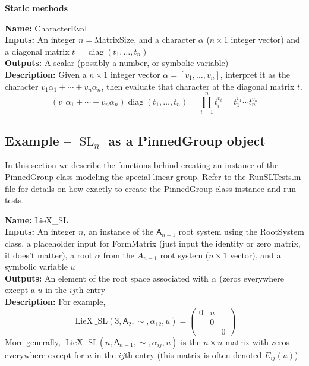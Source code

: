 \documentclass[12pt]{article}
\theoremstyle{definition}
\numberwithin{theorem}{subsection}
\newcommand{\tbf}{\textbf}
\newcommand{\noi}{\noindent}
\DeclareMathOperator{\SL}{SL}
\DeclareMathOperator{\diag}{diag}
\DeclareMathOperator{\LieX}{LieX}
\begin{document}
\begin{center}
\tbf{Static methods}
\end{center}

\begin{framed}
\noi \tbf{Name:} CharacterEval \\
\noi \tbf{Inputs:} An integer $n=$MatrixSize, and a character $\alpha$ ($n \times 1$ integer vector) and a diagonal matrix $t = \diag(t_1, \ldots, t_n)$ \\
\noi \tbf{Outputs:} A scalar (possibly a number, or symbolic variable) \\
\noi \tbf{Description:} Given a $n \times 1$ integer vector $\alpha = [v_1, \ldots, v_n]$, interpret it as the character $v_1 \alpha_1 + \cdots + v_n \alpha_n$, then evaluate that character at the diagonal matrix $t$.
\[
	(v_1 \alpha_1 + \cdots + v_n \alpha_n ) \diag(t_1, \ldots, t_n) = \prod_{i=1}^n t_i^{v_i} =  t_1^{v_1} \cdots t_n^{v_n}
\]
\end{framed}

\subsection{Example -- $\SL_n$ as a PinnedGroup object}

In this section we describe the functions behind creating an instance of the PinnedGroup class modeling the special linear group. Refer to the RunSLTests.m file for details on how exactly to create the PinnedGroup class instance and run tests.

\begin{framed}
\noi \tbf{Name:} LieX\_SL \\
\noi \tbf{Inputs:} An integer $n$, an instance of the $\mathsf{A}_{n-1}$ root system using the RootSystem class, a placeholder input for FormMatrix (just input the identity or zero matrix, it does't matter), a root $\alpha$ from the $A_{n-1}$ root system ($n \times 1$ vector), and a symbolic variable $u$ \\
\noi \tbf{Outputs:} An element of the root space associated with $\alpha$ (zeros everywhere except a $u$ in the $ij$th entry \\
\noi \tbf{Description:} For example,
\[
	\LieX\_\text{SL}(3,\mathsf{A}_{2},\sim,\alpha_{12}, u) =
	\begin{pmatrix}
		0 & u \\
		& 0 \\
		&& 0
	\end{pmatrix}
\]
More generally, $\LieX\_\text{SL}(n,\mathsf{A}_{n-1},\sim,\alpha_{ij}, u)$ is the $n \times n$ matrix with zeros everywhere except for $u$ in the $ij$th entry (this matrix is often denoted $E_{ij}(u)$).
\end{framed}
\end{document}
